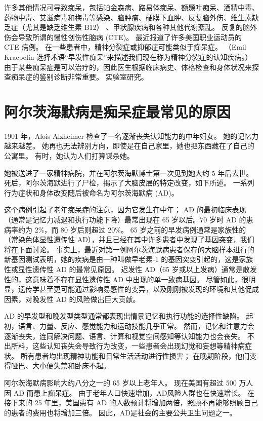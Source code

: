 许多其他情况可导致痴呆，包括帕金森病、路易体痴呆、额颞叶痴呆、酒精中毒、药物中毒、艾滋病毒和梅毒等感染、脑肿瘤、硬膜下血肿、反复脑外伤、维生素缺乏症（尤其是缺乏维生素 B12） 、甲状腺疾病和各种其他代谢紊乱。 反复的脑外伤会导致所谓的慢性创伤性脑病 (CTE)。 最近报道了许多美国职业运动员的 CTE 病例。 在一些患者中，精神分裂症或抑郁症可能类似于痴呆症。 （Emil Kraepelin 选择术语“早发性痴呆”来描述我们现在称为精神分裂症的认知疾病。）由于某些痴呆症是可以治疗的，因此医生根据临床病史、体格检查和身体状况来探查痴呆症的鉴别诊断非常重要。 实验室研究。

\section{阿尔茨海默病是痴呆症最常见的原因}

1901 年，Alois Alzheimer 检查了一名逐渐丧失认知能力的中年妇女。 她的记忆力越来越差。 她再也无法辨别方向，即使是在自己家里，她也把东西藏在了自己的公寓里。 有时，她认为人们打算谋杀她。

她被送进了一家精神病院，并在阿尔茨海默博士第一次见到她大约 5 年后去世。 死后，阿尔茨海默进行了尸检，揭示了大脑皮层的特定改变，如下所述。 一系列行为症状和身体改变随后被命名为阿尔茨海默病 (AD)。

这个病例引起了老年痴呆症的注意，因为它发生在中年； AD 的最初临床表现（通常是记忆力减退和执行功能下降）最常出现在 65 岁以后。70 岁时 AD 的患病率约为 2\%，而 80 岁后则超过 20\%。 65 岁之前的早发病例通常是家族性的（常染色体显性遗传性 AD），并且已经在其中许多患者中发现了基因突变，我们将在下面讨论。 事实上，最近对第一例阿尔茨海默病患者保存的大脑样本进行的新基因测试表明，她的疾病是由一种叫做早老素-1 的基因突变引起的，这是家族性或显性遗传性 AD 的最常见原因。 迟发性 AD（65 岁或以上发病）通常是散发性的，这意味着不存在显性遗传性 AD 中出现的单一致病基因。 尽管如此，很明显，遗传学甚至更可能通过影响易感性的变异，以及刚刚被发现的环境和其他促成因素，对晚发性 AD 的风险做出巨大贡献。

AD 的早发型和晚发型类型通常都表现出情景记忆和执行功能的选择性缺陷。 起初，语言、力量、反应、感觉能力和运动技能几乎正常。 然而，记忆和注意力会逐渐丧失，连同解决问题、语言、计算和视觉空间感知等认知能力也会丧失。 不出所料，这些认知丧失会导致行为改变，一些患者会出现幻觉和妄想等精神病症状。 所有患者均出现精神功能和日常生活活动进行性损害； 在晚期阶段，他们变得哑巴、大小便失禁和卧床不起。

阿尔茨海默病影响大约八分之一的 65 岁以上老年人。 现在美国有超过 500 万人因 AD 而患上痴呆症。 由于老年人口快速增加，AD风险人群也在快速增长。 在接下来的 25 年里，美国患有 AD 的人数预计将增加两倍，照顾不再能够照顾自己的患者的费用也将增加三倍。 因此，AD是社会的主要公共卫生问题之一。

